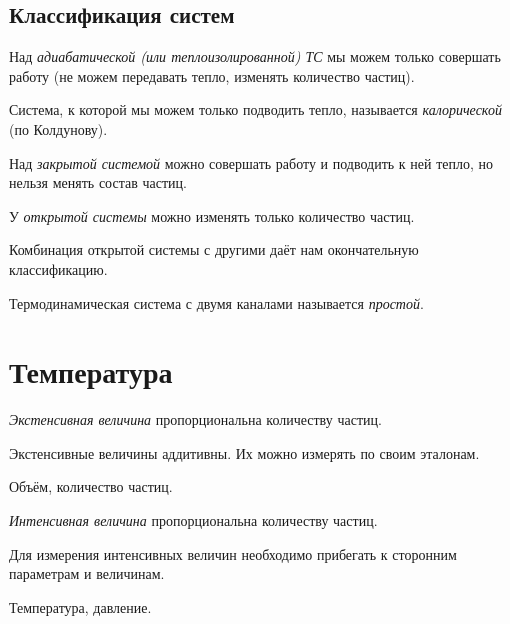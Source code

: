 \documentclass[../main.tex]{subfiles}
\begin{document}
    \subsection{Классификация систем}
        \begin{definition}
            Над \emph{адиабатической (или теплоизолированной) ТС} мы можем только совершать работу (не можем передавать тепло, изменять количество частиц).
        \end{definition}    
        \begin{definition}
            Система, к которой мы можем только подводить тепло, называется \emph{калорической} (по Колдунову).
        \end{definition}
        \begin{definition}
            Над \emph{закрытой системой} можно совершать работу и подводить к ней тепло, но нельзя менять состав частиц.
        \end{definition}
        \begin{definition}
            У \emph{открытой системы} можно изменять только количество частиц. 
        \end{definition}
        \begin{note}
            Комбинация открытой системы с другими даёт нам окончательную классификацию.
        \end{note}

        \begin{definition}
            Термодинамическая система с двумя каналами называется \emph{простой}.
        \end{definition}
       

        \section{Температура}
        \begin{definition}
            \emph{Экстенсивная величина} пропорциональна количеству частиц.
        \end{definition}
        \begin{note}
            Экстенсивные величины аддитивны. Их можно измерять по своим эталонам.
        \end{note}
        \begin{example}
            Объём, количество частиц.
        \end{example}

        \begin{definition}
            \emph{Интенсивная величина} пропорциональна количеству частиц.
        \end{definition}
        \begin{note}
            Для измерения интенсивных величин необходимо прибегать к сторонним параметрам и величинам.
        \end{note}
        \begin{example}
            Температура, давление.
        \end{example}
\end{document}
